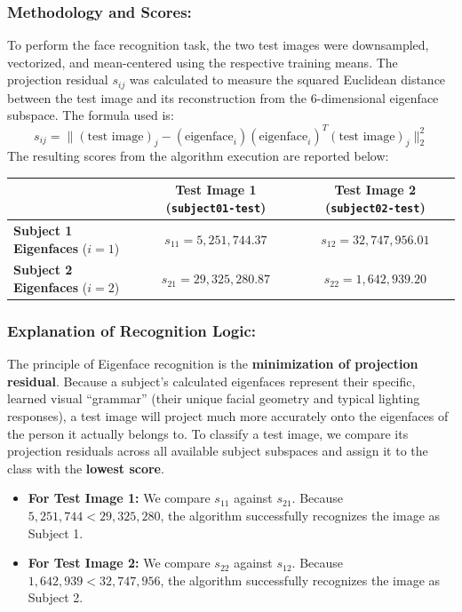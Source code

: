 \documentclass[twoside, 10pt]{article}
\begin{document}
\subsubsection{Methodology and Scores:} To perform the face recognition task, the two test images were downsampled, vectorized, and mean-centered using the respective training means. The projection residual $s_{ij}$ was calculated to measure the squared Euclidean distance between the test image and its reconstruction from the 6-dimensional eigenface subspace.
The formula used is:
$$s_{ij} = \|(\text{test image})_j - (\text{eigenface}_i)(\text{eigenface}_i)^T (\text{test image})_j\|_2^2$$
The resulting scores from the algorithm execution are reported below:
\begin{table}[H]
    \centering
    \renewcommand{\arraystretch}{1.5}
    \begin{tabular}{lcc}
        \toprule
         & \textbf{Test Image 1} (\texttt{subject01-test}) & \textbf{Test Image 2} (\texttt{subject02-test}) \\
        \midrule
        \textbf{Subject 1 Eigenfaces} ($i=1$) & $s_{11} = 5,251,744.37$ & $s_{12} = 32,747,956.01$ \\
        \textbf{Subject 2 Eigenfaces} ($i=2$) & $s_{21} = 29,325,280.87$ & $s_{22} = 1,642,939.20$ \\
        \bottomrule
    \end{tabular}
\end{table}
\subsubsection{Explanation of Recognition Logic:} The principle of Eigenface recognition is the \textbf{minimization of projection residual}. Because a subject's calculated eigenfaces represent their specific, learned visual ``grammar'' (their unique facial geometry and typical lighting responses), a test image will project much more accurately onto the eigenfaces of the person it actually belongs to.
To classify a test image, we compare its projection residuals across all available subject subspaces and assign it to the class with the \textbf{lowest score}.
\begin{itemize}
    \item \textbf{For Test Image 1:} We compare $s_{11}$ against $s_{21}$. Because $5,251,744 < 29,325,280$, the algorithm successfully recognizes the image as Subject 1.
    \item \textbf{For Test Image 2:} We compare $s_{22}$ against $s_{12}$. Because $1,642,939 < 32,747,956$, the algorithm successfully recognizes the image as Subject 2.
\end{itemize}
\end{document}
